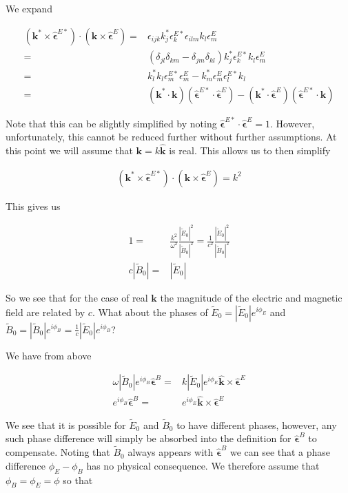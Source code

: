\documentclass[12pt]{article}
\newcommand{\ep}{\epsilon}
\renewcommand{\vec}[1]{\boldsymbol{#1}}
\newcommand{\unitvec}[1]{\hat{\boldsymbol{#1}}}
\begin{document}
We expand

\begin{align}
\left(\vec{k}^*\times \unitvec{\ep}^{E*}\right)\cdot\left(\vec{k}\times \unitvec{\ep}^E\right) =&
\ep_{ijk} k^*_j \ep^{E*}_k \ep_{ilm} k_l \ep^E_m\\
=&(\delta_{jl}\delta_{km} - \delta_{jm}\delta_{kl}) k^*_j \ep^{E*}_k k_l \ep^E_m\\
=& k^*_l k_l \ep^{E*}_m\ep^E_m - k^*_m\ep^E_m \ep^{E*}_lk_l\\
=& \left(\vec{k}^*\cdot\vec{k}\right)\left(\unitvec{\ep}^{E*}\cdot\unitvec{\ep}^E\right) - \left(\vec{k}^*\cdot\unitvec{\ep}^E\right)\left(\unitvec{\ep}^{E*}\cdot\vec{k}\right)
\end{align}

Note that this can be slightly simplified by noting $\unitvec{\ep}^{E*}\cdot\unitvec{\ep}^E=1$.
However, unfortunately, this cannot be reduced further without further assumptions.
At this point we will assume that $\vec{k} = k\unitvec{k}$ is real.
This allows us to then simplify

\begin{align}
\left(\vec{k}^*\times \unitvec{\ep}^{E*}\right)\cdot\left(\vec{k}\times \unitvec{\ep}^E\right) = k^2
\end{align}

This gives us

\begin{align}
1 =& \frac{k^2}{\omega^2} \frac{|\tilde{E}_0|^2}{|\tilde{B}_0|^2} = \frac{1}{c^2}\frac{|\tilde{E}_0|^2}{|\tilde{B}_0|^2}\\
c |\tilde{B}_0| =& |\tilde{E}_0|
\end{align}

So we see that for the case of real $\vec{k}$ the magnitude of the electric and magnetic field are related by $c$.
What about the phases of $\tilde{E}_0 = |\tilde{E}_0|e^{i\phi_E}$ and $\tilde{B}_0 = |\tilde{B}_0| e^{i\phi_B} = \frac{1}{c}|\tilde{E}_0|e^{i\phi_B}$?

We have from above

\begin{align}
\omega |\tilde{B}_0|e^{i\phi_B} \unitvec{\ep}^B =& k |\tilde{E}_0|e^{i\phi_E} \unitvec{k}\times \unitvec{\ep}^E\\
e^{i\phi_B}\unitvec{\ep}^B =& e^{i\phi_E}\unitvec{k}\times \unitvec{\ep}^E
\end{align}

We see that it is possible for $\tilde{E}_0$ and $\tilde{B}_0$ to have different phases, however, any such phase difference will simply be absorbed into the definition for $\unitvec{\ep}^B$ to compensate.
Noting that $\tilde{B}_0$ always appears with $\unitvec{\ep}^B$ we can see that a phase difference $\phi_E-\phi_B$ has no physical consequence.
We therefore assume that $\phi_B = \phi_E = \phi$ so that
\end{document}
